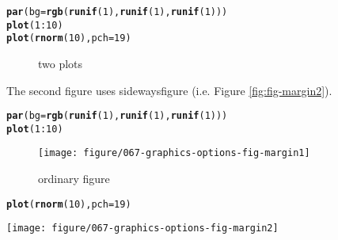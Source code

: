 \documentclass{article}\usepackage[]{graphicx}\usepackage[]{color}
\makeatletter
\newcommand{\hlfunctioncall}[1]{\textcolor[rgb]{0.501960784313725,0,0.329411764705882}{\textbf{#1}}}%
\newenvironment{kframe}{%
 \def\at@end@of@kframe{}%
 \ifinner\ifhmode%
  \def\at@end@of@kframe{\end{minipage}}%
  \begin{minipage}{\columnwidth}%
 \fi\fi%
 \def\FrameCommand##1{\hskip\@totalleftmargin \hskip-\fboxsep
 \colorbox{shadecolor}{##1}\hskip-\fboxsep
     \hskip-\linewidth \hskip-\@totalleftmargin \hskip\columnwidth}%
 \MakeFramed {\advance\hsize-\width
   \@totalleftmargin\z@ \linewidth\hsize
   \@setminipage}}%
 {\par\unskip\endMakeFramed%
 \at@end@of@kframe}
\newenvironment{knitrout}{}{} %
\makeatother
\begin{document}
\begin{knitrout}
\color{fgcolor}\begin{kframe}
\begin{alltt}
\hlfunctioncall{par}(bg = \hlfunctioncall{rgb}(\hlfunctioncall{runif}(1), \hlfunctioncall{runif}(1), \hlfunctioncall{runif}(1)))
\hlfunctioncall{plot}(1:10)
\hlfunctioncall{plot}(\hlfunctioncall{rnorm}(10), pch = 19)
\end{alltt}
\end{kframe}\begin{figure}[H]
\caption[two plots]{two plots\label{fig:fig-sub}}
\end{figure}


\end{knitrout}


The second figure uses sidewaysfigure (i.e. Figure \ref{fig:fig-margin2}).

\begin{knitrout}
\color{fgcolor}\begin{kframe}
\begin{alltt}
\hlfunctioncall{par}(bg = \hlfunctioncall{rgb}(\hlfunctioncall{runif}(1), \hlfunctioncall{runif}(1), \hlfunctioncall{runif}(1)))
\hlfunctioncall{plot}(1:10)
\end{alltt}
\end{kframe}\begin{figure}[H]

\texttt{[image: figure/067-graphics-options-fig-margin1]} \caption[ordinary figure]{ordinary figure\label{fig:fig-margin1}}
\end{figure}

\begin{kframe}\begin{alltt}
\hlfunctioncall{plot}(\hlfunctioncall{rnorm}(10), pch = 19)
\end{alltt}
\end{kframe}\begin{sidewaysfigure}[H]

\texttt{[image: figure/067-graphics-options-fig-margin2]} \caption[sideways figure]{sideways figure\label{fig:fig-margin2}}
\end{sidewaysfigure}


\end{knitrout}
\end{document}
